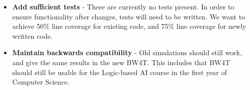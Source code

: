 \begin{itemize}
   \item
  \textbf{Add sufficient tests} - There are currently no tests present. In order to ensure functionality after changes, tests will need to be written. We want to achieve 50\% line coverage for existing code, and 75\% line coverage for newly written code. 
  \item
  \textbf{Maintain backwards compatibility} - Old simulations should still work, and give the same results in the new BW4T. This includes that BW4T should still be usable for the Logic-based AI course in the first year of Computer Science. 
\end{itemize}
